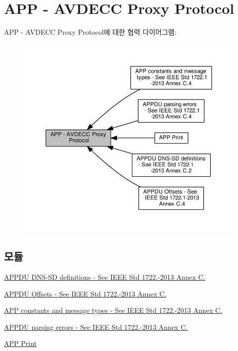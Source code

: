 \hypertarget{group__app}{}\section{A\+PP -\/ A\+V\+D\+E\+CC Proxy Protocol}
\label{group__app}
A\+PP -\/ A\+V\+D\+E\+CC Proxy Protocol에 대한 협력 다이어그램\+:
\nopagebreak
\begin{figure}[H]
\begin{center}
\leavevmode
\includegraphics[width=350pt]{group__app}
\end{center}
\end{figure}
\subsection*{모듈}
\begin{DoxyCompactItemize}
\item 
\hyperlink{group__appdu__dns__sd}{A\+P\+P\+D\+U D\+N\+S-\/\+S\+D definitions -\/ See I\+E\+E\+E Std 1722.-\/2013 Annex C.}
\item 
\hyperlink{group__appdu__offset}{A\+P\+P\+D\+U Offsets -\/ See I\+E\+E\+E Std 1722.-\/2013 Annex C.}
\item 
\hyperlink{group__appdu__constants}{A\+P\+P constants and message types -\/ See I\+E\+E\+E Std 1722.-\/2013 Annex C.}
\item 
\hyperlink{group__appdu__errors}{A\+P\+P\+D\+U parsing errors -\/ See I\+E\+E\+E Std 1722.-\/2013 Annex C.}
\item 
\hyperlink{group__app__print}{A\+P\+P Print}
\end{DoxyCompactItemize}
